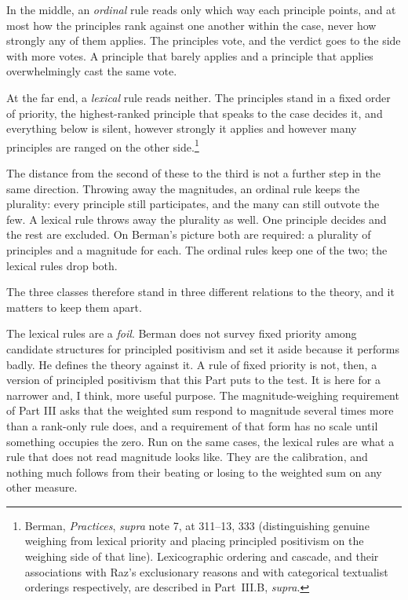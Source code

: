 In the middle, an \textit{ordinal} rule reads only which way each principle
points, and at most how the principles rank against one another within the case,
never how strongly any of them applies. The principles vote, and the
verdict goes to the side with more votes. A principle that barely applies
and a principle that applies overwhelmingly cast the same vote.

At the far end, a \textit{lexical} rule reads neither. The principles stand in a fixed
order of priority, the highest-ranked principle that speaks to the case
decides it, and everything below is silent, however strongly it applies
and however many principles are ranged on the other
side.\footnote{Berman, \textit{Practices}, \textit{supra} note 7, at
311--13, 333 (distinguishing genuine weighing from lexical priority and
placing principled positivism on the weighing side of that line).
Lexicographic ordering and cascade, and their associations with Raz's
exclusionary reasons and with categorical textualist orderings
respectively, are described in Part~III.B, \textit{supra}.}

The distance from the second of these to the third is not a further step
in the same direction. Throwing away the magnitudes, an ordinal rule keeps the plurality: every
principle still participates, and the many can still outvote the few. A
lexical rule throws away the plurality as well. One principle decides and
the rest are excluded. On Berman's picture both are required: a plurality
of principles and a magnitude for each. The
ordinal rules keep one of the two; the lexical rules drop both.

The three classes therefore stand in three different relations to the
theory, and it matters to keep them apart.

The lexical rules are a
\textit{foil}. Berman does not survey fixed priority among candidate structures for
principled positivism and set it aside because it performs badly. He
defines the theory against it. A rule of fixed priority is
not, then, a version of principled positivism that this Part puts to the
test. It is here for a narrower and, I think, more useful purpose. The
magnitude-weighing requirement of Part III asks that the weighted sum respond
to magnitude several times more than a rank-only rule does, and a
requirement of that form has no scale until something occupies the zero.
Run on the same cases, the lexical rules are what a rule that does not read
magnitude looks like. They are the calibration, and nothing much follows from their beating or
losing to the weighted sum on any other measure.

